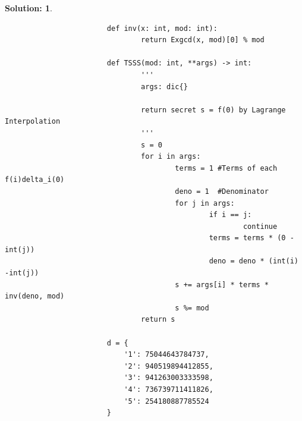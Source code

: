 \documentclass{article}
\theoremstyle{break}
\newtheorem*{solution*}{\textbf{Solution:} }
\begin{document}
\begin{enumerate}
\begin{solution*}
\begin{lstlisting}
                        def inv(x: int, mod: int):
                                return Exgcd(x, mod)[0] % mod
                        
                        def TSSS(mod: int, **args) -> int:
                                '''
                                args: dic{}
                        
                                return secret s = f(0) by Lagrange Interpolation
                                '''
                                s = 0
                                for i in args:
                                        terms = 1 #Terms of each f(i)delta_i(0)
                                        deno = 1  #Denominator
                                        for j in args:
                                                if i == j:
                                                        continue
                                                terms = terms * (0 - int(j))
                                                deno = deno * (int(i) -int(j))
                                        s += args[i] * terms * inv(deno, mod)
                                        s %= mod
                                return s
                        
                        d = {
                            '1': 75044643784737,
                            '2': 940519894412855,
                            '3': 941263003333598,
                            '4': 736739711411826,
                            '5': 254180887785524
                        }
                        

\end{lstlisting}
\end{solution*}
\end{enumerate}
\end{document}
